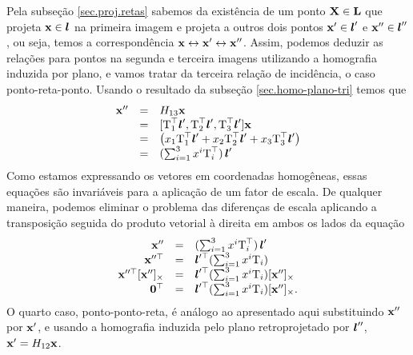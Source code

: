 Pela subseção \ref{sec.proj.retas} sabemos da existência de um ponto $\mathbf{X}\in{\bf L}$ que projeta $\mathbf{x}\in\boldsymbol{l}$ na primeira imagem e projeta a outros dois pontos $\mathbf{x}'\in\boldsymbol{l}'$ e $\mathbf{x}''\in\boldsymbol{l}''$, ou seja, temos a correspondência $\mathbf{x}\leftrightarrow\mathbf{x}'\leftrightarrow\mathbf{x}''$. Assim, podemos deduzir as relações para 
pontos na segunda e terceira imagens utilizando a homografia induzida por plano, e vamos tratar da terceira relação de incidência, o caso ponto-reta-ponto. Usando o resultado da subseção \ref{sec.homo-plano-tri} temos que 
\begin{equation*}
\begin{array}{rcl}
\mathbf{x}''&=&H_{13}\mathbf{x}\\
&=&[\mbox{T}_1^\top\boldsymbol{l}',\mbox{T}_2^\top\boldsymbol{l}',\mbox{T}_3^\top\boldsymbol{l}']\mathbf{x}\\
&=&
\begin{pmatrix}
x_1\mbox{T}_1^\top\boldsymbol{l}'+x_2\mbox{T}_2^\top\boldsymbol{l}'+x_3\mbox{T}_3^\top\boldsymbol{l}'
\end{pmatrix}\\
&=&(\sum_{i=1}^3 x^i\mbox{T}_i^\top)\,\boldsymbol{l}'
\end{array}
\end{equation*}
Como estamos expressando os vetores em coordenadas homogêneas, essas equações são invariáveis para a aplicação de um fator de escala. De qualquer maneira, podemos eliminar o problema das diferenças de escala aplicando a transposição seguida do produto vetorial à direita em ambos os lados da equação
\begin{equation}\label{eq.ponto-reta-ponto}
\begin{array}{rcl}
\mathbf{x}''&=&(\sum_{i=1}^3 x^i\mbox{T}_i^\top)\,\boldsymbol{l}'\\
\mathbf{x}''^\top&=&\boldsymbol{l}'^\top(\sum_{i=1}^3 x^i\mbox{T}_i)\\
\mathbf{x}''^\top[\mathbf{x}'']_\times&=&\boldsymbol{l}'^\top(\sum_{i=1}^3 x^i\mbox{T}_i)[\mathbf{x}'']_\times\\
{\bf 0}^\top&=&\boldsymbol{l}'^\top(\sum_{i=1}^3 x^i\mbox{T}_i)[\mathbf{x}'']_\times.
\end{array}
\end{equation}
O quarto caso, ponto-ponto-reta, é análogo ao apresentado aqui substituindo $\mathbf{x}''$ por $\mathbf{x}'$, e usando a homografia induzida pelo plano retroprojetado por $\boldsymbol{l}''$, $\mathbf{x}'=H_{12}\mathbf{x}$.

